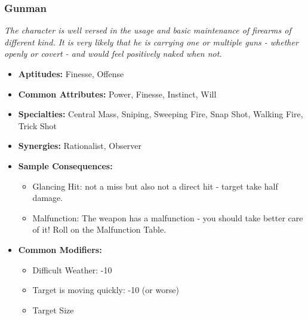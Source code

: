 \subsubsection{Gunman}\label{Gunman}
\textit{The character is well versed in the usage and basic maintenance of firearms of different kind.
It is very likely that he is carrying one or multiple guns - whether openly or covert - and would feel positively naked when not.}
\begin{itemize}
	\item \textbf{Aptitudes:} Finesse, Offense
	\item \textbf{Common Attributes:} Power, Finesse, Instinct, Will
	\item \textbf{Specialties:} Central Mass, Sniping, Sweeping Fire, Snap Shot, Walking Fire, Trick Shot
	\item \textbf{Synergies:} Rationalist, Observer
	\item \textbf{Sample Consequences:}
	\begin{itemize}
		\item Glancing Hit: not a miss but also not a direct hit - target take half damage.
		\item Malfunction: The weapon has a malfunction - you should take better care of it! Roll on the Malfunction Table.
	\end{itemize}
	\item \textbf{Common Modifiers:}
	\begin{itemize}
		\item Difficult Weather: -10
		\item Target is moving quickly: -10 (or worse)
		\item Target Size
	\end{itemize}
\end{itemize}

